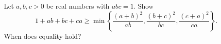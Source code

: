 Let $a,b,c>0$ be real numbers with $abc = 1$. Show
$$1 + ab + bc + ca \geq \min\left\{ \frac{(a+b)^2}{ab}, \frac{(b+c)^2}{bc}, \frac{(c+a)^2}{ca} \right\}.$$
When does equality hold?
